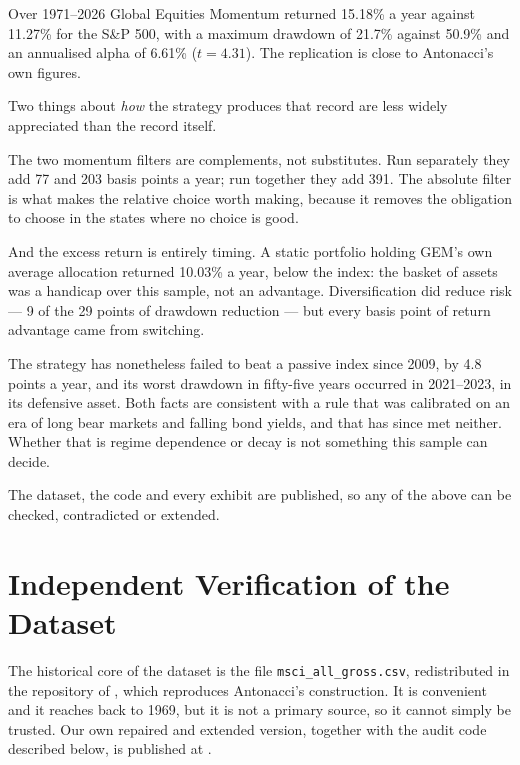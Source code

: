 \documentclass[11pt,a4paper]{article}
\let\oldsection\section
\renewcommand{\section}{\FloatBarrier\oldsection}
\begin{document}
Over 1971--2026 Global Equities Momentum returned 15.18\% a year against
11.27\% for the S\&P 500, with a maximum drawdown of 21.7\% against 50.9\% and
an annualised alpha of 6.61\% ($t = 4.31$). The replication is close to
Antonacci's own figures.

Two things about \emph{how} the strategy produces that record are less widely
appreciated than the record itself.

The two momentum filters are complements, not substitutes. Run separately they
add 77 and 203 basis points a year; run together they add 391. The absolute
filter is what makes the relative choice worth making, because it removes the
obligation to choose in the states where no choice is good.

And the excess return is entirely timing. A static portfolio holding GEM's own
average allocation returned 10.03\% a year, below the index: the basket of
assets was a handicap over this sample, not an advantage. Diversification did
reduce risk --- 9 of the 29 points of drawdown reduction --- but every basis
point of return advantage came from switching.

The strategy has nonetheless failed to beat a passive index since 2009, by 4.8
points a year, and its worst drawdown in fifty-five years occurred in
2021--2023, in its defensive asset. Both facts are consistent with a rule that
was calibrated on an era of long bear markets and falling bond yields, and that
has since met neither. Whether that is regime dependence or decay is not
something this sample can decide.

The dataset, the code and every exhibit are published, so any of the above can
be checked, contradicted or extended.



\appendix
\section{Independent Verification of the Dataset}
\label{app:audit}

The historical core of the dataset is the file \texttt{msci\_all\_gross.csv},
redistributed in the repository of \citet{jansengem}, which reproduces
Antonacci's construction. It is convenient and it reaches back to 1969, but it
is not a primary source, so it cannot simply be trusted. Our own repaired and
extended version, together with the audit code described below, is published at
\citet{petit2026data}.
\end{document}
